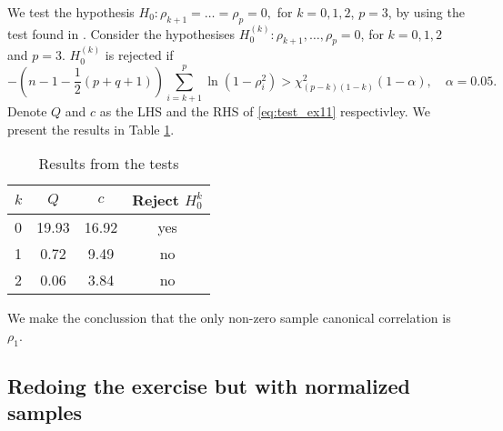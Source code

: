 We test the hypothesis $H_0: \rho_{k+1} = \dots = \rho_{p} = 0,$ for $k
= 0,1,2$, $p = 3$, by using the test found in
\cite[p. 565]{book}. Consider the hypothesises $H_{0}^{(k)}:
\rho_{k+1},\dots, \rho_{p} = 0$, for $k = 0,1,2$ and $p =
3$. $H_{0}^{(k)}$ is rejected if 
\begin{equation}\label{eq:test_ex11}
  -\left(n - 1  - \frac{1}{2}(p+q+1)\right) \sum_{i = k+1}^{p} \ln (1 -
  \rho_{i}^{2}) > \chi^{2}_{(p-k)(1-k)}(1-\alpha), \quad \alpha = 0.05.
\end{equation}
Denote $Q$ and $c$ as the LHS and the RHS of \eqref{eq:test_ex11}
respectivley. We present the results in Table \ref{tab:test_ex11}. 
\begin{table}
  \centering
  \begin{tabular}{l|ccc}
    $k$&$Q$&$c$& Reject $H_{0}^{k}$ \\ \hline
    0 &19.93 &16.92 & yes \\ 
    1 &0.72 &9.49 & no \\ 
    2 &0.06 &3.84 & no  
  \end{tabular}
  \caption{Results from the tests}
  \label{tab:test_ex11}
\end{table}
We make the conclussion that the only non-zero sample canonical
correlation is $\rho_{1}$.
\subsection*{Redoing the exercise but with normalized samples}
\label{sec:redoing-exercise-but}


